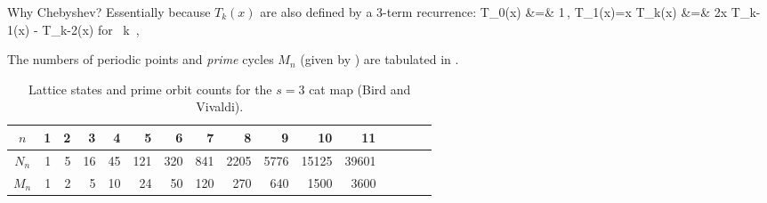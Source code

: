 Why Chebyshev? Essentially because $T_k(x)$ are also
defined by a 3-term recurrence:
\bea
T_0(x) &=& 1\,,\quad
T_1(x)=x
    \continue
T_k(x)  &=&  2x T_{k-1}(x) - T_{k-2}(x)
\quad \mbox{for } k 
\,,
\label{Rangarajan17:TkRecurr}
\eea


The
numbers of {periodic points} and \emph{prime} cycles $M_n$ (given by
) are tabulated in .

\begin{table}
\begin{tabular}{c|rrrrr|rrrrr|rrrrr}
$n$ &  1 &  2 &  3 &  4 &  5 &
       6 &  7 &  8 &  9 & 10 &
      11 \\%
\hline
$N_n$ &   1 &   5 &  16 &  45 &  121 &
        320 & 841 & 2205 &5776 &15125&
       39601& %
             \rule[-1ex]{0ex}{3.5ex} \\
$M_n$ &   1 &   2 &   5 &  10 &   24 &
         50 & 120 & 270 & 640 & 1500 &
       3600 &  %
\end{tabular}
\bigskip
\caption{\label{tab:catMapN_n-s=3}
Lattice states and {prime} orbit counts for the ${s}=3$ cat map
(Bird and Vivaldi).
        }
\end{table}
